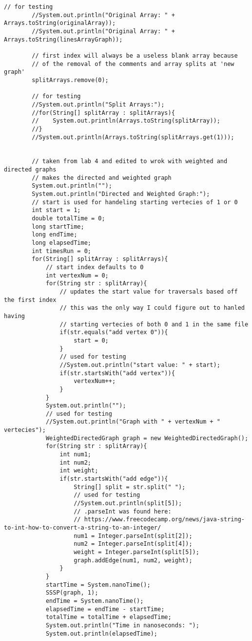 \documentclass[10pt]{article}
\begin{document}
\begin{lstlisting}[frame=single, ]
        // for testing
        //System.out.println("Original Array: " + Arrays.toString(originalArray));
        //System.out.println("Original Array: " + Arrays.toString(linesArrayGraph));

        // first index will always be a useless blank array because
        // of the removal of the comments and array splits at 'new graph'
        splitArrays.remove(0);

        // for testing
        //System.out.println("Split Arrays:");
        //for(String[] splitArray : splitArrays){
        //    System.out.println(Arrays.toString(splitArray));
        //}
        //System.out.println(Arrays.toString(splitArrays.get(1)));


        // taken from lab 4 and edited to wrok with weighted and directed graphs
        // makes the directed and weighted graph
        System.out.println("");
        System.out.println("Directed and Weighted Graph:");
        // start is used for handeling starting vertecies of 1 or 0
        int start = 1;
        double totalTime = 0;
        long startTime;
        long endTime;
        long elapsedTime;
        int timesRun = 0;
        for(String[] splitArray : splitArrays){
            // start index defaults to 0
            int vertexNum = 0;
            for(String str : splitArray){
                // updates the start value for traversals based off the first index
                // this was the only way I could figure out to hanled having
                // starting vertecies of both 0 and 1 in the same file
                if(str.equals("add vertex 0")){
                    start = 0;
                }
                // used for testing
                //System.out.println("start value: " + start);
                if(str.startsWith("add vertex")){
                    vertexNum++;
                }
            }
            System.out.println("");
            // used for testing
            //System.out.println("Graph with " + vertexNum + " vertecies");
            WeightedDirectedGraph graph = new WeightedDirectedGraph();
            for(String str : splitArray){
                int num1;
                int num2;
                int weight;
                if(str.startsWith("add edge")){
                    String[] split = str.split(" ");
                    // used for testing
                    //System.out.println(split[5]);
                    // .parseInt was found here:
                    // https://www.freecodecamp.org/news/java-string-to-int-how-to-convert-a-string-to-an-integer/
                    num1 = Integer.parseInt(split[2]);
                    num2 = Integer.parseInt(split[4]);
                    weight = Integer.parseInt(split[5]);
                    graph.addEdge(num1, num2, weight);
                }
            }
            startTime = System.nanoTime();
            SSSP(graph, 1);
            endTime = System.nanoTime();
            elapsedTime = endTime - startTime;
            totalTime = totalTime + elapsedTime;
            System.out.println("Time in nanoseconds: ");
            System.out.println(elapsedTime);


\end{lstlisting}
\end{document}

